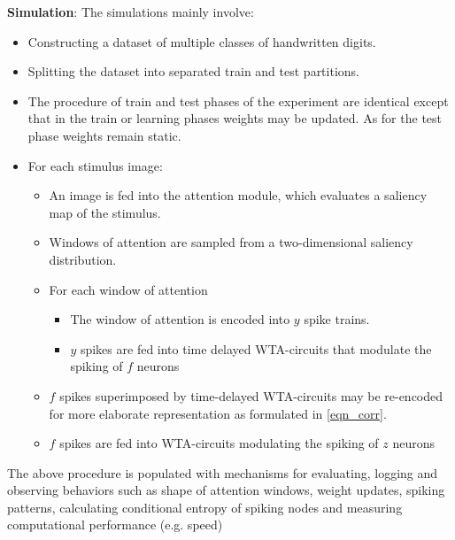 \documentclass{report}
\begin{document}
\textbf{Simulation}: The simulations mainly involve:
\begin{itemize}
  \item Constructing a dataset of multiple classes of handwritten digits.
  \item Splitting the dataset into separated train and test partitions.
  \item The procedure of train and test phases of the experiment are identical except that in the train or learning phases weights may be updated. As for the test phase weights remain static.
  \item For each stimulus image:
  \begin{itemize}
  	\item An image is fed into the attention module, which evaluates a saliency map of the stimulus.
  	\item Windows of attention are sampled from a two-dimensional saliency distribution.
  	\item For each window of attention
  	\begin{itemize}
	  	\item The window of attention is encoded into $y$ spike trains.
	  	\item $y$ spikes are fed into time delayed WTA-circuits that modulate the spiking of $f$ neurons
		\end{itemize}
		\item $f$ spikes superimposed by time-delayed WTA-circuits may be re-encoded for more elaborate representation as formulated in \ref{eqn_corr}.
		\item $f$ spikes are fed into WTA-circuits modulating the spiking of $z$ neurons
	\end{itemize}
\end{itemize}
The above procedure is populated with mechanisms for evaluating, logging and observing behaviors such as shape of attention windows, weight updates, spiking patterns, calculating conditional entropy of spiking nodes and measuring computational performance (e.g. speed)\\
\end{document}
